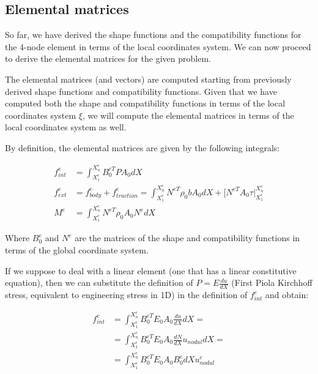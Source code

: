 \subsection{Elemental matrices}
\label{subsec:elemental_matrices}

So far, we have derived the shape functions and the compatibility functions for the 4-node element in terms of the local coordinates system.
We can now proceed to derive the elemental matrices for the given problem.

The elemental matrices (and vectors) are computed starting from previously derived shape functions and compatibility functions.
Given that we have computed both the shape and compatibility functions in terms of the local coordinates system $\xi$, we will compute the elemental matrices in terms of the local coordinates system as well.

By definition, the elemental matrices are given by the following integrals:


\begin{align}
    \label{eq:elemental_matrices}
    f_{int}^e & = \int_{X_1^e}^{X_n^e} B_0^{eT} P A_0 dX                                                                             \\
    f_{ext}^e & = f_{body}^e + f_{traction}^e = \int_{X_1^e}^{X_n^e} N^{eT} \rho_0 b A_0 dX + [N^{eT} A_0 \tau \Big|_{X_1^e}^{X_n^e} \\
    M^e       & = \int_{X_1^e}^{X_n^e} N^{eT} \rho_0 A_0 N^e dX
\end{align}

Where $B_0^e$ and $N^e$ are the matrices of the shape and compatibility functions in terms of the global coordinate system.

If we suppose to deal with a linear element (one that has a linear constitutive equation), then we can substitute the definition of $P = E \frac{du}{dX}$ (First Piola Kirchhoff stress, equivalent to engineering stress in 1D) in the definition of $f_{int}^e$ and obtain:

\begin{align}
    f_{int}^e & = \int_{X_1^e}^{X_n^e} B_0^{eT} E_0 A_0 \frac{du}{dX} dX =           \\
              & = \int_{X_1^e}^{X_n^e} B_0^{eT} E_0 A_0 \frac{dN}{dX} u_{nodal} dX = \\
              & = \int_{X_1^e}^{X_n^e} B_0^{eT} E_0 A_0 B_0^e dX u_{nodal}^e
\end{align}

